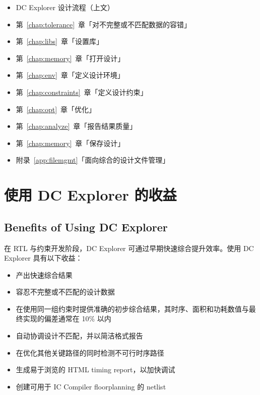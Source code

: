 \begin{seeAlsoBox}
\begin{itemize}
  \item DC Explorer 设计流程（上文）
  \item 第~\ref{chap:tolerance}~章「对不完整或不匹配数据的容错」
  \item 第~\ref{chap:libs}~章「设置库」
  \item 第~\ref{chap:memory}~章「打开设计」
  \item 第~\ref{chap:env}~章「定义设计环境」
  \item 第~\ref{chap:constraints}~章「定义设计约束」
  \item 第~\ref{chap:opt}~章「优化」
  \item 第~\ref{chap:analyze}~章「报告结果质量」
  \item 第~\ref{chap:memory}~章「保存设计」
  \item 附录~\ref{app:filemgmt}「面向综合的设计文件管理」
\end{itemize}
\end{seeAlsoBox}

\section{使用 DC Explorer 的收益}
\subsection*{Benefits of Using DC Explorer}

在 RTL 与约束开发阶段，DC Explorer 可通过早期快速综合提升效率。使用 DC Explorer 具有以下收益：
\begin{itemize}
  \item 产出快速综合结果
  \item 容忍不完整或不匹配的设计数据
  \item 在使用同一组约束时提供准确的初步综合结果，其时序、面积和功耗数值与最终实现的偏差通常在 10\% 以内
  \item 自动协调设计不匹配，并以简洁格式报告
  \item 在优化其他关键路径的同时检测不可行时序路径
  \item 生成易于浏览的 HTML timing report，以加快调试
  \item 创建可用于 IC Compiler floorplanning 的 netlist
\end{itemize}

